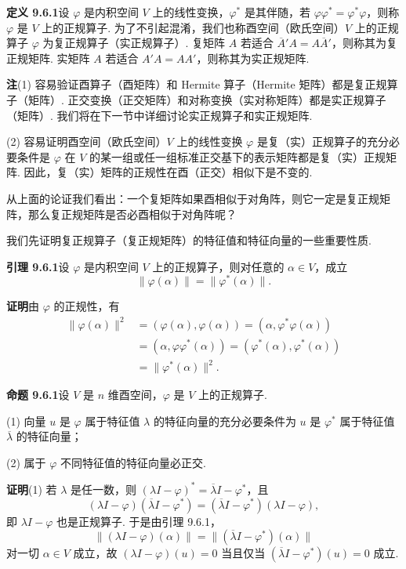 \documentclass[UTF8,12pt,a4paper,fontset=fandol]{ctexart}
\begin{document}
\noindent\textbf{定义 9.6.1}\quad 设 $\varphi$ 是内积空间 $V$ 上的线性变换，$\varphi^*$ 是其伴随，若 $\varphi\varphi^*=\varphi^*\varphi$，则称 $\varphi$ 是 $V$ 上的正规算子. 为了不引起混淆，我们也称酉空间（欧氏空间）$V$ 上的正规算子 $\varphi$ 为复正规算子（实正规算子）. 复矩阵 $A$ 若适合 $\overline A'A=A\overline A'$，则称其为复正规矩阵. 实矩阵 $A$ 若适合 $A'A=AA'$，则称其为实正规矩阵.

\noindent\textbf{注}\quad (1) 容易验证酉算子（酉矩阵）和 Hermite 算子（Hermite 矩阵）都是复正规算子（矩阵）. 正交变换（正交矩阵）和对称变换（实对称矩阵）都是实正规算子（矩阵）. 我们将在下一节中详细讨论实正规算子和实正规矩阵.

(2) 容易证明酉空间（欧氏空间）$V$ 上的线性变换 $\varphi$ 是复（实）正规算子的充分必要条件是 $\varphi$ 在 $V$ 的某一组或任一组标准正交基下的表示矩阵都是复（实）正规矩阵. 因此，复（实）矩阵的正规性在酉（正交）相似下是不变的.

从上面的论证我们看出：一个复矩阵如果酉相似于对角阵，则它一定是复正规矩阵，那么复正规矩阵是否必酉相似于对角阵呢？

我们先证明复正规算子（复正规矩阵）的特征值和特征向量的一些重要性质.

\noindent\textbf{引理 9.6.1}\quad 设 $\varphi$ 是内积空间 $V$ 上的正规算子，则对任意的 $\alpha\in V$，成立
\[
  \|\varphi(\alpha)\|=\|\varphi^*(\alpha)\|.
\]

\noindent\textbf{证明}\quad 由 $\varphi$ 的正规性，有
\[
\begin{aligned}
  \|\varphi(\alpha)\|^2
  &= (\varphi(\alpha),\varphi(\alpha))=(\alpha,\varphi^*\varphi(\alpha))\\
  &= (\alpha,\varphi\varphi^*(\alpha))=(\varphi^*(\alpha),\varphi^*(\alpha))\\
  &= \|\varphi^*(\alpha)\|^2.
\end{aligned}
\]

\noindent\textbf{命题 9.6.1}\quad 设 $V$ 是 $n$ 维酉空间，$\varphi$ 是 $V$ 上的正规算子.

(1) 向量 $u$ 是 $\varphi$ 属于特征值 $\lambda$ 的特征向量的充分必要条件为 $u$ 是 $\varphi^*$ 属于特征值 $\overline\lambda$ 的特征向量；

(2) 属于 $\varphi$ 不同特征值的特征向量必正交.

\noindent\textbf{证明}\quad (1) 若 $\lambda$ 是任一数，则 $(\lambda I-\varphi)^*=\overline\lambda I-\varphi^*$，且
\[
  (\lambda I-\varphi)(\overline\lambda I-\varphi^*)=(\overline\lambda I-\varphi^*)(\lambda I-\varphi),
\]
即 $\lambda I-\varphi$ 也是正规算子. 于是由引理 9.6.1，
\[
  \|(\lambda I-\varphi)(\alpha)\|=\|(\overline\lambda I-\varphi^*)(\alpha)\|
\]
对一切 $\alpha\in V$ 成立，故 $(\lambda I-\varphi)(u)=0$ 当且仅当 $(\overline\lambda I-\varphi^*)(u)=0$ 成立.
\end{document}
